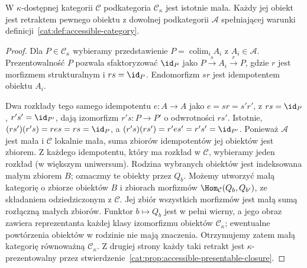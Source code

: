 \begin{stwierdzenie}\label{cat:prop:accessible-small-presentables}
W $\kappa$-dostępnej kategorii $\mathcal C$ podkategoria $\mathcal C_\kappa$ jest istotnie mała. Każdy jej obiekt jest retraktem pewnego obiektu z dowolnej podkategorii $\mathcal A$ spełniającej warunki definicji~\ref{cat:def:accessible-category}.
\end{stwierdzenie}
\begin{proof}
Dla $P\in\mathcal C_\kappa$ wybieramy przedstawienie $P=\operatorname{colim}_i A_i$ z $A_i\in\mathcal A$. Prezentowalność $P$ pozwala sfaktoryzować $\id_P$ jako $P\xrightarrow{s}A_i\xrightarrow{r}P$, gdzie $r$ jest morfizmem strukturalnym i $rs=\id_P$. Endomorfizm $sr$ jest idempotentem obiektu $A_i$.

Dwa rozkłady tego samego idempotentu $e:A\to A$ jako $e=sr=s'r'$, z $rs=\id_P$, $r's'=\id_{P'}$, dają izomorfizm $r's:P\to P'$ o odwrotności $rs'$. Istotnie, $(rs')(r's)=r e s=rs=\id_P$, a $(r's)(rs')=r'e s'=r's'=\id_{P'}$. Ponieważ $\mathcal A$ jest mała i $\mathcal C$ lokalnie mała, suma zbiorów idempotentów jej obiektów jest zbiorem. Z każdego idempotentu, który ma rozkład w $\mathcal C$, wybieramy jeden rozkład (w większym uniwersum). Rodzina wybranych obiektów jest indeksowana małym zbiorem $B$; oznaczmy te obiekty przez $Q_b$. Możemy utworzyć małą kategorię o zbiorze obiektów $B$ i zbiorach morfizmów $\Hom_{\mathcal C}(Q_b,Q_{b'})$, ze składaniem odziedziczonym z $\mathcal C$. Jej zbiór wszystkich morfizmów jest małą sumą rozłączną małych zbiorów. Funktor $b\mapsto Q_b$ jest w pełni wierny, a jego obraz zawiera reprezentanta każdej klasy izomorfizmu obiektów $\mathcal C_\kappa$; ewentualne powtórzenia obiektów w rodzinie nie mają znaczenia. Otrzymujemy zatem małą kategorię równoważną $\mathcal C_\kappa$. Z drugiej strony każdy taki retrakt jest $\kappa$-prezentowalny przez stwierdzenie~\ref{cat:prop:accessible-presentable-closure}.
\end{proof}


